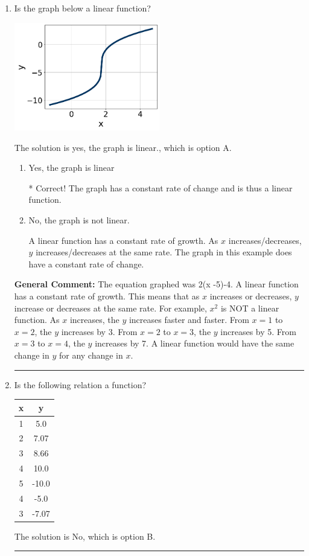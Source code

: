 \documentclass{extbook}[14pt]
\newcommand{\litem}[1]{\item #1

\rule{\textwidth}{0.4pt}}
\begin{document}
\begin{enumerate}\litem{
Is the graph below a linear function?

\begin{center}
    \includegraphics[width=0.5\textwidth]{../Figures/MA_8_F_1_2_graphN.png}
\end{center}


The solution is yes, the graph is linear., which is option A.

\begin{enumerate}[label=\Alph*.]
\item Yes, the graph is linear

* Correct! The graph has a constant rate of change and is thus a linear function.
\item No, the graph is not linear.

A linear function has a constant rate of growth. As $x$ increases/decreases, $y$ increases/decreases at the same rate. The graph in this example does have a constant rate of change.
\end{enumerate}


\textbf{General Comment:} The equation graphed was 2(x -5)-4. A linear function has a constant rate of growth. This means that as $x$ increases or decreases, $y$ increase or decreases at the same rate. For example, $x^2$ is NOT a linear function. As $x$ increases, the $y$ increases faster and faster. From $x=1$ to $x=2$, the $y$ increases by 3. From $x=2$ to $x=3$, the $y$ increases by 5. From $x=3$ to $x=4$, the $y$ increases by 7. A linear function would have the same change in $y$ for any change in $x$.
}
\litem{
Is the following relation a function?


\begin{tabular}{c|c}
x &y\tabularnewline \hline
1 &5.0\tabularnewline \hline
2 &7.07\tabularnewline \hline
3 &8.66\tabularnewline \hline
4 &10.0\tabularnewline \hline
5 &-10.0\tabularnewline \hline
4 &-5.0\tabularnewline \hline
3 &-7.07\end{tabular}The solution is No, which is option B.

}
\end{enumerate}
\end{document}
